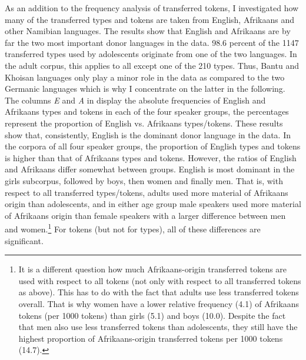 \documentclass[output=paper]{langsci/langscibook}
\begin{document}
As an addition to the frequency analysis of transferred tokens, I investigated how many of the transferred types and tokens are taken from English, Afrikaans and other Namibian languages. The results show that English and Afrikaans are by far the two most important donor languages in the data. 98.6 percent of the 1147 transferred types used by adolescents originate from one of the two languages. In the adult corpus, this applies to all except one of the 210 types. Thus, Bantu and Khoisan languages only play a minor role in the data as compared to the two Germanic languages which is why I concentrate on the latter in the following. The columns \textit{E} and \textit{A} in  display the absolute frequencies of English and Afrikaans types and tokens in each of the four speaker groups, the percentages represent the proportion of English vs. Afrikaans types/tokens. These results show that, consistently, English is the dominant donor language in the data. In the corpora of all four speaker groups, the proportion of English types and tokens is higher than that of Afrikaans types and tokens. However, the ratios of English and Afrikaans differ somewhat between groups. English is most dominant in the girls subcorpus, followed by boys, then women and finally men. That is, with respect to all transferred types/tokens, adults used more material of Afrikaans origin than adolescents, and in either age group male speakers used more material of Afrikaans origin than female speakers with a larger difference between men and women.\footnote{It is a different question how much Afrikaans-origin transferred tokens are used with respect to all tokens (not only with respect to all transferred tokens as above). This has to do with the fact that adults use less transferred tokens overall. That is why women have a lower relative frequency (4.1) of Afrikaans tokens (per 1000 tokens) than girls (5.1) and boys (10.0). Despite the fact that men also use less transferred tokens than adolescents, they still have the highest proportion of Afrikaans-origin transferred tokens per 1000 tokens (14.7).} For tokens (but not for types), all of these differences are significant.

  
\end{document}
